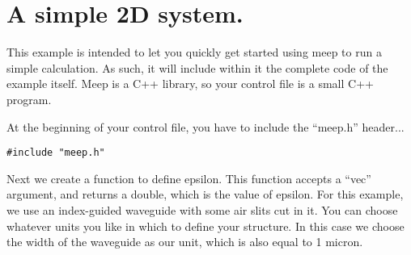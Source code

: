 \begin{comment}
/*
\end{comment}
\section{A simple 2D system.}
\begin{comment}
*/
\end{comment}

This example is intended to let you quickly get started using meep to run
a simple calculation.  As such, it will include within it the complete code
of the example itself.  Meep is a C++ library, so your control file is a
small C++ program.

At the beginning of your control file, you have to include the ``meep.h''
header...
\begin{verbatim}
#include "meep.h"
\end{verbatim}

Next we create a function to define epsilon.  This function accepts a
``vec'' argument, and returns a double, which is the value of epsilon.  For
this example, we use an index-guided waveguide with some air slits cut in
it.  You can choose whatever units you like in which to define your
structure.  In this case we choose the width of the waveguide as our unit,
which is also equal to 1 micron.

